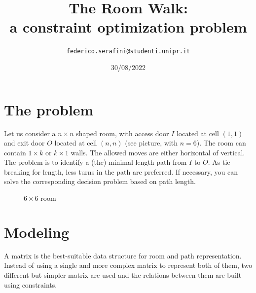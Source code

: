 \documentclass[12pt]{article}
\title
{
  The Room Walk:\\
  a constraint optimization problem
}
\author{
  \texttt{federico.serafini@studenti.unipr.it}
}
\date{30/08/2022}
\begin{document}
\begin{titlepage}
  \clearpage\maketitle
  \thispagestyle{empty}
\end{titlepage}


\tableofcontents
\newpage

\section{The problem}

Let us consider a $n \times n$ shaped room, with access door $I$ located at cell
$(1, 1)$ and exit door $O$ located at cell $(n, n)$ (see picture, with $n = 6$).
The room can contain $1 \times k$ or $k \times 1$ walls. The allowed moves are either horizontal of vertical.
The problem is to identify a (the) minimal length path from $I$ to $O$. As tie
breaking for length, less turns in the path are preferred. If necessary, you
can solve the corresponding decision problem based on path length.

\begin{figure}[H]
  \begin{center}
  \end{center}
  \caption{$6 \times 6$ room} \label{room}
\end{figure}

\section{Modeling}
A matrix is the best-suitable data structure for room and path representation.
Instead of using a single and more complex matrix to represent both of them,
two different but simpler matrix are used and the relations between them are
built using constraints.
\end{document}
